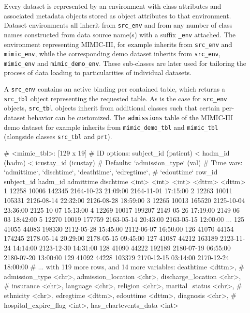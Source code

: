 \documentclass[
  notitle]{jss}
\begin{document}
Every dataset is represented by an environment with class attributes and
associated metadata objects stored as object attributes to that
environment. Dataset environments all inherit from \texttt{src\_env} and
from any number of class names constructed from data source name(s) with
a suffix \texttt{\_env} attached. The environment representing
MIMIC-III, for example inherits from \texttt{src\_env} and
\texttt{mimic\_env}, while the corresponding demo dataset inherits from
\texttt{src\_env}, \texttt{mimic\_env} and \texttt{mimic\_demo\_env}.
These sub-classes are later used for tailoring the process of data
loading to particularities of individual datasets.

A \texttt{src\_env} contains an active binding per contained table,
which returns a \texttt{src\_tbl} object representing the requested
table. As is the case for \texttt{src\_env} objects, \texttt{src\_tbl}
objects inherit from additional classes such that certain per-dataset
behavior can be customized. The \texttt{admissions} table of the
MIMIC-III demo dataset for example inherits from
\texttt{mimic\_demo\_tbl} and \texttt{mimic\_tbl} (alongside classes
\texttt{src\_tbl} and \texttt{prt}).

\begin{CodeChunk}
\begin{CodeOutput}
# <mimic_tbl>: [129 x 19]
# ID options:  subject_id (patient) < hadm_id (hadm) < icustay_id (icustay)
# Defaults:    `admission_type` (val)
# Time vars:   `admittime`, `dischtime`, `deathtime`, `edregtime`,
#   `edouttime`
    row_id subject_id hadm_id admittime           dischtime
     <int>      <int>   <int> <dttm>              <dttm>
  1  12258      10006  142345 2164-10-23 21:09:00 2164-11-01 17:15:00
  2  12263      10011  105331 2126-08-14 22:32:00 2126-08-28 18:59:00
  3  12265      10013  165520 2125-10-04 23:36:00 2125-10-07 15:13:00
  4  12269      10017  199207 2149-05-26 17:19:00 2149-06-03 18:42:00
  5  12270      10019  177759 2163-05-14 20:43:00 2163-05-15 12:00:00
...
125  41055      44083  198330 2112-05-28 15:45:00 2112-06-07 16:50:00
126  41070      44154  174245 2178-05-14 20:29:00 2178-05-15 09:45:00
127  41087      44212  163189 2123-11-24 14:14:00 2123-12-30 14:31:00
128  41090      44222  192189 2180-07-19 06:55:00 2180-07-20 13:00:00
129  41092      44228  103379 2170-12-15 03:14:00 2170-12-24 18:00:00
# ... with 119 more rows, and 14 more variables: deathtime <dttm>,
#   admission_type <chr>, admission_location <chr>, discharge_location <chr>,
#   insurance <chr>, language <chr>, religion <chr>, marital_status <chr>,
#   ethnicity <chr>, edregtime <dttm>, edouttime <dttm>, diagnosis <chr>,
#   hospital_expire_flag <int>, has_chartevents_data <int>
\end{CodeOutput}
\end{CodeChunk}
\end{document}
